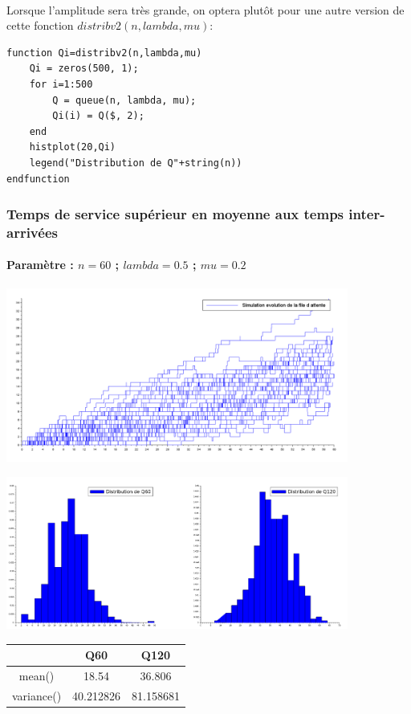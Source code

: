 \documentclass{article}
\begin{document}
\paragraph{}
Lorsque l'amplitude sera très grande, on optera plutôt pour une autre version de cette fonction $distribv2(n,lambda,mu)$: 
\begin{verbatim}
function Qi=distribv2(n,lambda,mu)
    Qi = zeros(500, 1);
    for i=1:500
        Q = queue(n, lambda, mu);
        Qi(i) = Q($, 2);
    end
    histplot(20,Qi)
    legend("Distribution de Q"+string(n))
endfunction
\end{verbatim}

\subsubsection{Temps de service supérieur en moyenne aux temps inter-arrivées}
\paragraph{Paramètre : $n=60$ ; $lambda=0.5$ ; $mu=0.2$}
\begin{center}
	\includegraphics[width=425px]{img/inf.PNG}
\end{center}
\begin{center}
	\includegraphics[width=425px]{img/sup/dist.png}
\end{center}
\begin{center}
	\begin{tabular}{c|cc}
		\hline \hline
		& Q60 & Q120 \\
		\hline
		mean() & 18.54 & 36.806 \\
		variance() & 40.212826 & 81.158681 \\
		\hline \hline
	\end{tabular}
\end{center}
\end{document}
